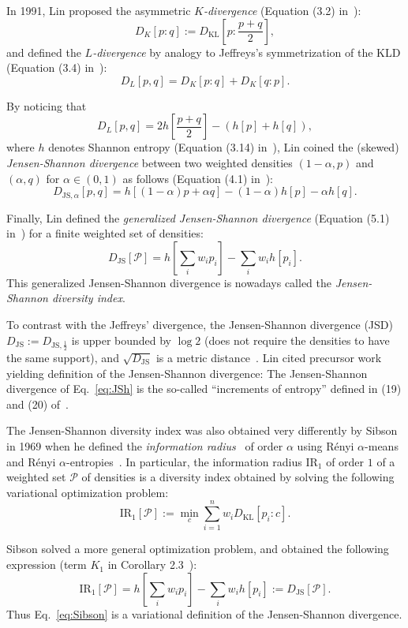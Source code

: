 \documentclass[11pt]{article}
\def\calP{\mathcal{P}}
\def\KL{\mathrm{KL}}
\def\JS{\mathrm{JS}}
\def\IR{\mathrm{IR}}
\begin{document}
In 1991, Lin proposed the asymmetric {\em $K$-divergence} (Equation (3.2) in~\citep{JS-1991}):
$$
D_K[p:q]:=D_\KL\left[p:\frac{p+q}{2}\right],
$$
and defined the {\em $L$-divergence} by analogy to Jeffreys's symmetrization of the KLD (Equation (3.4) in~\citep{JS-1991}):
$$
D_L[p,q]=D_K[p:q]+D_K[q:p].
$$

By noticing that 
$$
D_L[p,q]= 2 h\left[\frac{p+q}{2}\right]-(h[p]+h[q]),
$$ 
where $h$ denotes Shannon entropy (Equation (3.14) in~\citep{JS-1991}), Lin coined the (skewed) {\em Jensen-Shannon divergence} between two weighted densities $(1-\alpha,p)$ and $(\alpha,q)$ for $\alpha\in(0,1)$ as follows (Equation (4.1) in~\citep{JS-1991}):
\begin{equation}\label{eq:JSh}
D_{\JS,\alpha}[p,q]=h[(1-\alpha)p+\alpha q]-(1-\alpha)h[p]-\alpha h[q].
\end{equation}

Finally, Lin defined the {\em generalized Jensen-Shannon divergence} (Equation (5.1) in~\citep{JS-1991}) for a finite weighted set of densities:
$$
D_\JS[\calP]=h\left[\sum_i w_ip_i\right]-\sum_i w_i h[p_i].
$$
This generalized Jensen-Shannon divergence is nowadays called the {\em Jensen-Shannon diversity index}.

To contrast with the Jeffreys' divergence, the Jensen-Shannon divergence (JSD) $D_\JS:=D_{\JS,\frac{1}{2}}$ is upper bounded by $\log 2$ (does not require the densities to have the same support), and $\sqrt{D_\JS}$ is 
a metric distance~\citep{JSmetric-2003,JSmetric-2004}.
Lin cited precursor work~\citep{WongYOU-1985,JW-1988} yielding definition of the Jensen-Shannon divergence:
The Jensen-Shannon divergence  of Eq.~\ref{eq:JSh} is the so-called ``increments of entropy'' defined in (19) and (20) of~\citep{WongYOU-1985}.

The Jensen-Shannon diversity index was also obtained very differently by Sibson in 1969 when he defined the {\em information radius}~\citep{Sibson-1969} of order $\alpha$ using R\'enyi $\alpha$-means and R\'enyi $\alpha$-entropies~\citep{Renyi-1961}.
In particular, the information radius $\IR_1$ of order $1$ of a weighted set $\calP$ of densities is a diversity index obtained by solving the following variational optimization problem:
\begin{equation}
\IR_{1}[\calP]:=\min_{c} \sum_{i=1}^n w_i D_\KL[p_i:c].  \label{eq:Sibson}
\end{equation}

Sibson solved a more general optimization problem, and obtained the following expression (term $K_1$ in Corollary 2.3~\citep{Sibson-1969}):
$$
\IR_{1}[\calP]=  h\left[\sum_i w_ip_i\right]-\sum_i w_i h[p_i]:=D_\JS[\calP].
$$
Thus Eq.~\ref{eq:Sibson} is a variational definition of the Jensen-Shannon divergence.
\end{document}
